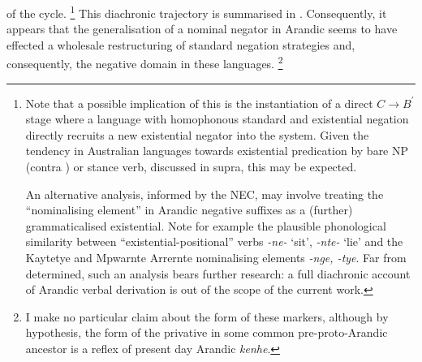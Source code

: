 \documentclass[output=paper,draft,draftmode,colorlinks,citecolor=brown]{langscibook}
\begin{document}
of the cycle.%
%
\footnote{Note that a possible implication of this is the instantiation of
a direct $C\to B^\prime$ stage where a language with homophonous standard
and existential negation directly recruits a new existential negator into
the system. Given the tendency in Australian languages towards existential
predication by bare NP (contra \citealt{Croft1991}) or stance verb,
discussed in  supra, this may be expected.
	
An alternative analysis, informed by the NEC, may involve treating the
``nominalising element'' in Arandic negative suffixes as a (further)
grammaticalised existential. Note for example the plausible phonological
similarity between ``existential-positional'' verbs \textit{-ne-} `sit',
\textit{-nte-} `lie' and the Kaytetye and Mpwarnte
Arrernte nominalising elements \textit{-nge, -tye}. Far from determined, such an analysis bears further research: a full diachronic account of Arandic verbal derivation is out of the scope of the current work.} 
%
This diachronic trajectory is summarised in . 
Consequently, it appears that the generalisation of a nominal negator in
Arandic seems to have effected a wholesale restructuring of standard
negation strategies and, consequently, the negative domain in these
languages.%
%
\footnote{I make no particular claim about the form of these markers, although by hypothesis, the form of the privative in some common pre-proto-Arandic ancestor is a reflex of present day Arandic \textit{\textdblhyphen kenhe}.}
%
\end{document}
